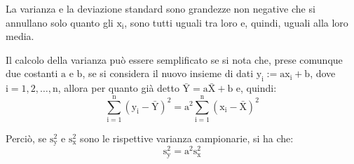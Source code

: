 La varianza e la deviazione standard sono grandezze non negative che si annullano solo quanto gli $\mathrm{x_i}$, sono tutti uguali tra loro e, quindi, uguali alla loro media.

\medskip
Il calcolo della varianza può essere semplificato se si nota che, prese comunque due costanti $\mathrm{a}$ e $\mathrm{b}$, se si considera il nuovo insieme di dati $\mathrm{y_i := ax_i + b}$, dove $\mathrm{i = 1, 2, \dots, n}$, allora per quanto già detto $\mathrm{\bar{Y} = a \bar{X} + b}$ e, quindi:
\begin{equation*}
\mathrm{\sum_{i=1}^{n}(y_i - \bar{Y})^2 = a^2 \sum_{i=1}^{n}(x_i - \bar{X})^2}
\end{equation*}


Perciò, se $\mathrm{s_y^2}$ e $\mathrm{s_x^2}$ sono le rispettive varianza campionarie, si ha che:
\begin{equation*}
\mathrm{s_y^2 = a^2 s_x^2}
\end{equation*}

